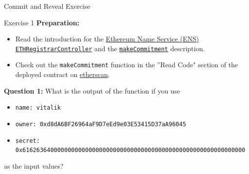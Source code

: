 \documentclass[handout]{beamer}
\begin{document}
\begin{frame}{Commit and Reveal Exercise}
	
	\begin{exercise}{Exercise 1}
		\textbf{Preparation:}
		\begin{itemize}
			\item Read the introduction for the \href{https://docs.ens.domains/contract-api-reference/.eth-permanent-registrar/controller}{\link Ethereum Name Service (ENS) \texttt{ETHRegistrarController}} and the \href{https://docs.ens.domains/contract-api-reference/.eth-permanent-registrar/controller\#calculate-commitment-hash}{\link \texttt{makeCommitment}} description.
			\item Check out the \texttt{makeCommitment} function in the ''Read Code" section of the deployed contract on \href{https://etherscan.io/address/0x283af0b28c62c092c9727f1ee09c02ca627eb7f5\#readContract}{\link etherscan}.
		\end{itemize}
		
		\textbf{Question 1:} What is the output of the function if you use
					
		\begin{itemize}
			\item \texttt{name: vitalik}
			\item \texttt{owner: 0xd8dA6BF26964aF9D7eEd9e03E53415D37aA96045}
			\item \texttt{secret: 0x6162636400000000000000000000000000000000000000000000000000000000}
		\end{itemize}
		
		as the input values?
					
	\end{exercise}	
\end{frame}
\end{document}
